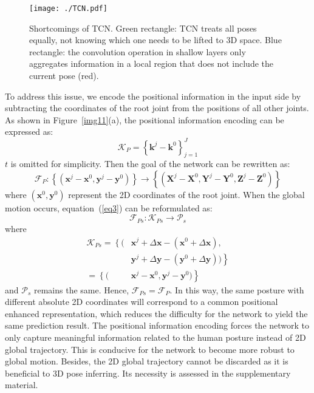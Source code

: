 \documentclass[sigconf]{acmart}
\begin{document}
\begin{figure}
  \centering
  \texttt{[image: ./TCN.pdf]}
  \vspace{-0.8cm}
  \caption{Shortcomings of TCN. Green rectangle: TCN treats all poses equally, not knowing which one needs to be lifted to 3D space. Blue rectangle: the convolution operation in shallow layers only aggregates information in a local region that does not include the current pose (red).}
  \vspace{-0.2cm}
  \label{img4}
\end{figure}

To address this issue, we encode the positional information in the input side by subtracting the coordinates of the root joint from the positions of all other joints. As shown in Figure~\ref{img11}(a), the positional information encoding can be expressed as:
\begin{equation}
\mathcal{K}_{P}=\left\{{\mathbf{k}}^{j}-{\mathbf{k}}^{0}\right\}_{j=1}^{J}
\end{equation}
$t$ is omitted for simplicity. Then the goal of the network can be rewritten as:
\begin{equation}\label{eq3}
\mathcal{F}_{P}:\left\{(\mathbf{x}^{j}-\mathbf{x}^{0},\mathbf{y}^{j}-\mathbf{y}^{0})\right\}\rightarrow \left\{(\mathbf{X}^{j}-\mathbf{X}^{0},\mathbf{Y}^{j}-\mathbf{Y}^{0},\mathbf{Z}^{j}-\mathbf{Z}^{0})\right\}
\end{equation}
where ${(\mathbf{x}^{0},\mathbf{y}^{0})}$ represent the 2D coordinates of the root joint. When the global motion occurs, equation~(\ref{eq3}) can be reformulated as:
\begin{equation}
\mathcal{F}_{Ps}:\mathcal{K}_{Ps}\rightarrow \mathcal{P}_{s}
\end{equation}
where
\begin{equation}
\begin{aligned}
\mathcal{K}_{Ps}=\left\{\right.(&\mathbf{x}^{j}+\Delta\mathbf{x}-(\mathbf{x}^{0}+\Delta\mathbf{x}),\\
&\mathbf{y}^{j}+\Delta\mathbf{y}-(\mathbf{y}^{0}+\Delta\mathbf{y}))\left.\right\}\\
=\left\{\right.(&\mathbf{x}^{j}-\mathbf{x}^{0},\mathbf{y}^{j}-\mathbf{y}^{0})\left.\right\}
\end{aligned}
\end{equation}
and $\mathcal{P}_{s}$ remains the same. Hence, $\mathcal{F}_{Ps}=\mathcal{F}_{P}$. In this way, the same posture with different absolute 2D coordinates will correspond to a common positional enhanced representation, which reduces the difficulty for the network to yield the same prediction result. The positional information encoding forces the network to only capture meaningful information related to the human posture instead of 2D global trajectory. This is conducive for the network to become more robust to global motion. Besides, the 2D global trajectory cannot be discarded as it is beneficial to 3D pose inferring. Its necessity is assessed in the supplementary material.
\end{document}
